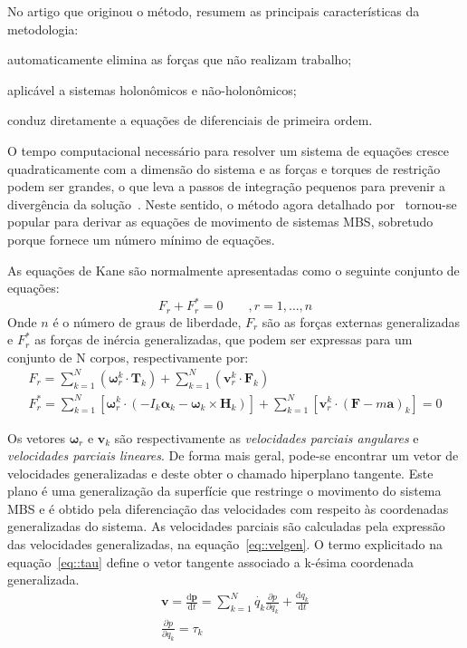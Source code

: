 No artigo que originou o método, \citet{kane1965derivation} resumem
as principais características da metodologia: 
%
\begin{enumerate*}[label=\emph{\alph*})]
	\item automaticamente elimina as forças que não realizam trabalho;
	\item aplicável a sistemas holonômicos e não-holonômicos;
	\item conduz diretamente a equações de diferenciais de primeira ordem.
\end{enumerate*}

O tempo computacional necessário para resolver um sistema de equações cresce
quadraticamente com a dimensão do sistema e as forças e torques de restrição
podem ser grandes, o que leva a passos de integração pequenos para prevenir a
divergência da solução~\cite{stoneking2013implementation}. Neste sentido, o
método agora detalhado por~\citet{kane1985dynamics} tornou-se popular para
derivar as equações de movimento de sistemas MBS, sobretudo porque fornece um
número mínimo de equações.

As equações de Kane são normalmente apresentadas como o seguinte conjunto de
equações:
%
\begin{equation} \label{eq::kane}
	F_r + F_r^{*} = 0 \qquad, r = 1,\ldots,n
\end{equation}
%
Onde $n$ é o número de graus de liberdade, $F_r$ são as forças externas
generalizadas e $F_r^{*}$ as forças de inércia generalizadas, que podem ser
expressas para um conjunto de N corpos, respectivamente por:
%
\begin{gather}
	F_r = \sum_{k=1}^{N}(\boldsymbol{\omega}_r^k \cdot \mathbf{T}_k) +
\sum_{k=1}^{N}(\mathbf{v}_r^k \cdot \mathbf{F}_k) \\
	F_r^{*} = \sum_{k=1}^{N}\left[\boldsymbol{\omega}_r^k \cdot (-I_k
\boldsymbol{\alpha}_k - \boldsymbol{\omega}_k \times \mathbf{H}_k)\right] +
\sum_{k=1}^{N}\left[ \mathbf{v}_r^k \cdot (\mathbf{F} - m \mathbf{a})_k \right]
= 0
\end{gather}
%

Os vetores $\boldsymbol{\omega}_r$ e $\mathbf{v}_k$ são respectivamente as
\emph{velocidades parciais angulares} e \emph{velocidades parciais lineares}. De
forma mais geral, pode-se encontrar um vetor de velocidades generalizadas e
deste obter o chamado hiperplano tangente.
Este plano é uma generalização da superfície que restringe o movimento do
sistema MBS e é obtido pela diferenciação das velocidades com respeito às
coordenadas generalizadas do sistema. As velocidades parciais são calculadas
pela expressão das velocidades generalizadas, na equação~\ref{eq::velgen}. O
termo explicitado na equação~\ref{eq::tau} define o vetor tangente associado a
k-ésima coordenada generalizada.
%
\begin{gather}
	\mathbf{v} = \frac{\mathrm{d} \mathbf{p}}{\mathrm{d} t} = \sum_{k=1}^{N}
	\dot{q_{k}} \frac{\partial p}{\partial q_{k}} + \frac{\mathrm{d}
	q_{k}}{\mathrm{d} t} \label{eq::velgen}\\
	\frac{\partial p}{\partial q_{k}} = \tau_{k} \label{eq::tau}
\end{gather}
%


